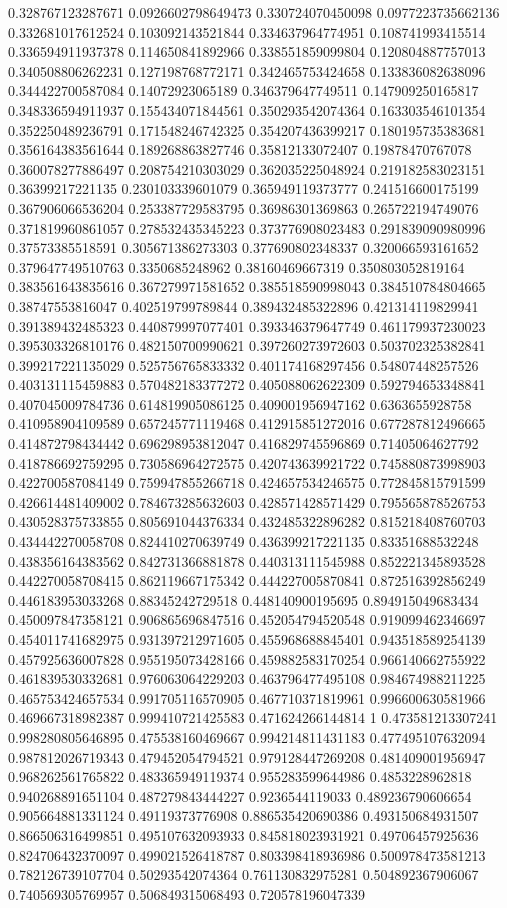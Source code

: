 \begin{table}
\begin{tabu}
\begin{sparkline}{10}
0.328767123287671 0.0926602798649473 0.330724070450098 0.0977223735662136 0.332681017612524 0.103092143521844 0.334637964774951 0.108741993415514 0.336594911937378 0.114650841892966 0.338551859099804 0.120804887757013 0.340508806262231 0.127198768772171 0.342465753424658 0.133836082638096 0.344422700587084 0.14072923065189 0.346379647749511 0.147909250165817 0.348336594911937 0.155434071844561 0.350293542074364 0.163303546101354 0.352250489236791 0.171548246742325 0.354207436399217 0.180195735383681 0.356164383561644 0.189268863827746 0.35812133072407 0.19878470767078 0.360078277886497 0.208754210303029 0.362035225048924 0.219182583023151 0.36399217221135 0.230103339601079 0.365949119373777 0.241516600175199 0.367906066536204 0.253387729583795 0.36986301369863 0.265722194749076 0.371819960861057 0.278532435345223 0.373776908023483 0.291839090980996 0.37573385518591 0.305671386273303 0.377690802348337 0.320066593161652 0.379647749510763 0.3350685248962 0.38160469667319 0.350803052819164 0.383561643835616 0.367279971581652 0.385518590998043 0.384510784804665 0.38747553816047 0.402519799789844 0.389432485322896 0.421314119829941 0.391389432485323 0.440879997077401 0.393346379647749 0.461179937230023 0.395303326810176 0.482150700990621 0.397260273972603 0.503702325382841 0.399217221135029 0.525756765833332 0.401174168297456 0.54807448257526 0.403131115459883 0.570482183377272 0.405088062622309 0.592794653348841 0.407045009784736 0.614819905086125 0.409001956947162 0.6363655928758 0.410958904109589 0.657245771119468 0.412915851272016 0.677287812496665 0.414872798434442 0.696298953812047 0.416829745596869 0.71405064627792 0.418786692759295 0.730586964272575 0.420743639921722 0.745880873998903 0.422700587084149 0.759947855266718 0.424657534246575 0.772845815791599 0.426614481409002 0.784673285632603 0.428571428571429 0.795565878526753 0.430528375733855 0.805691044376334 0.432485322896282 0.815218408760703 0.434442270058708 0.824410270639749 0.436399217221135 0.83351688532248 0.438356164383562 0.842731366881878 0.440313111545988 0.852221345893528 0.442270058708415 0.862119667175342 0.444227005870841 0.872516392856249 0.446183953033268 0.88345242729518 0.448140900195695 0.894915049683434 0.450097847358121 0.906865696847516 0.452054794520548 0.919099462346697 0.454011741682975 0.931397212971605 0.455968688845401 0.943518589254139 0.457925636007828 0.955195073428166 0.459882583170254 0.966140662755922 0.461839530332681 0.976063064229203 0.463796477495108 0.984674988211225 0.465753424657534 0.991705116570905 0.467710371819961 0.996600630581966 0.469667318982387 0.999410721425583 0.471624266144814 1 0.473581213307241 0.998280805646895 0.475538160469667 0.994214811431183 0.477495107632094 0.987812026719343 0.479452054794521 0.979128447269208 0.481409001956947 0.968262561765822 0.483365949119374 0.955283599644986 0.4853228962818 0.940268891651104 0.487279843444227 0.9236544119033 0.489236790606654 0.905664881331124 0.49119373776908 0.886535420690386 0.493150684931507 0.866506316499851 0.495107632093933 0.845818023931921 0.49706457925636 0.824706432370097 0.499021526418787 0.803398418936986 0.500978473581213 0.782126739107704 0.50293542074364 0.761130832975281 0.504892367906067 0.740569305769957 0.506849315068493 0.720578196047339 
\end{sparkline}
\end{tabu}
\end{table}
